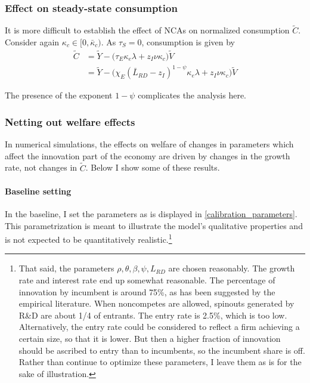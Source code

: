 \documentclass[12pt,english]{article}
\theoremstyle{remark}
\begin{document}
\subsubsection{Effect on steady-state consumption}

It is more difficult to establish the effect of NCAs on normalized consumption $\tilde{C}$. Consider again $\kappa_c \in [0, \bar{\kappa}_c)$. As $\tau_S = 0$, consumption is given by 
\begin{align*}
	\tilde{C} &= \tilde{Y} - \Big( \tau_E  \kappa_e \lambda + z_I \nu \kappa_c \Big) \tilde{V} \\
	  &= \tilde{Y} - \Big( \chi_E (\bar{L}_{RD} - z_I)^{1-\psi} \kappa_e \lambda + z_I \nu \kappa_c \Big) \tilde{V}
\end{align*}

The presence of the exponent $1-\psi$ complicates the analysis here. 

\subsubsection{Netting out welfare effects}

In numerical simulations, the effects on welfare of changes in parameters which affect the innovation part of the economy are driven by changes in the growth rate, not changes in $\tilde{C}$. Below I show some of these results.

\paragraph{Baseline setting} In the baseline, I set the parameters as is displayed in \autoref{calibration_parameters}. This parametrization is meant to illustrate the model's qualitative properties and is not expected to be quantitatively realistic.\footnote{That said, the parameters $\rho, \theta, \beta, \psi, L_{RD}$ are chosen reasonably. The growth rate and interest rate end up somewhat reasonable. The percentage of innovation by incumbent is around 75\%, as has been suggested by the empirical literature. When noncompetes are allowed, spinouts generated by R\&D are about 1/4 of entrants. The entry rate is 2.5\%, which is too low. Alternatively, the entry rate could be considered to reflect a firm achieving a certain size, so that it is lower. But then a higher fraction of innovation should be ascribed to entry than to incumbents, so the incumbent share is off. Rather than continue to optimize these parameters, I leave them as is for the sake of illustration.}
\end{document}
